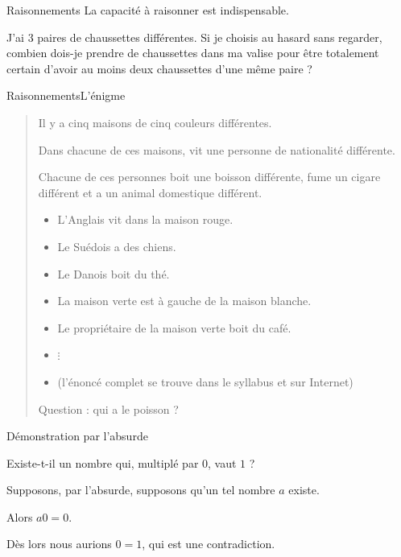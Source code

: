 \begin{frame}{Raisonnements}%
  La capacité à raisonner est indispensable.

  \begin{example}
    J'ai 3 paires de chaussettes différentes. Si je choisis au hasard sans regarder, combien dois-je prendre de chaussettes dans ma valise pour être totalement certain d'avoir au moins deux chaussettes d'une même paire ?
  \end{example}
\end{frame}

\begin{frame}{Raisonnements}{L'énigme}
  \begin{quote}
    Il y a cinq maisons de cinq couleurs différentes.

    Dans chacune de ces maisons, vit une personne de nationalité différente.

    Chacune de ces personnes boit une boisson différente, fume un cigare différent et a un animal domestique différent.
    \begin{itemize}
    \item L'Anglais vit dans la maison rouge.
    \item Le Suédois a des chiens.
    \item Le Danois boit du thé.
    \item La maison verte est à gauche de la maison blanche.
    \item Le propriétaire de la maison verte boit du café.
    \item \(\vdots\)
    \item (l'énoncé complet se trouve dans le syllabus et sur Internet)
    \end{itemize}
    Question : qui a le poisson ?
  \end{quote}
\end{frame}

\begin{frame}{Démonstration par l'absurde}
  \begin{question}
    Existe-t-il un nombre qui, multiplé par \(0\), vaut \(1\) ?
  \end{question}\pause

\begin{example}
  Supposons, par l'absurde, supposons qu'un tel nombre \(a\) existe.

  Alors \(a0 = 0\).

  Dès lors nous aurions \(0 = 1\), qui est une contradiction.
\end{example}
\end{frame}


